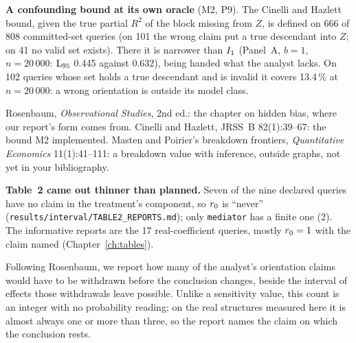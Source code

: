 \textbf{A confounding bound at its own oracle} (M2, P9). The Cinelli and Hazlett bound, given the true
partial $R^{2}$ of the block missing from $Z$, is defined on 666 of 808 committed-set queries (on 101
the wrong claim put a true descendant into $Z$; on 41 no valid set exists). There it is narrower than
$I_{1}$ (Panel~A, $b = 1$, $n = 20\,000$: $\mathrm{L}_{95}$ 0.445 against 0.632), being handed what the analyst
lacks. On 102 queries whose set holds a true descendant and is invalid it covers 13.4\,\% at
$n = 20\,000$: a wrong orientation is outside its model class.

\begin{fonte}
Rosenbaum, \emph{Observational Studies}, 2nd ed.: the chapter on hidden bias, where our report's form
comes from. Cinelli and Hazlett, JRSS~B 82(1):39--67: the bound M2 implemented. Masten and Poirier's
breakdown frontiers, \emph{Quantitative Economics} 11(1):41--111: a breakdown value with inference,
outside graphs, not yet in your bibliography.
\end{fonte}

\textbf{Table~2 came out thinner than planned.} Seven of the nine declared queries have no claim in the
treatment's component, so $r_{0}$ is ``never'' (\texttt{results/interval/TABLE2\_REPORTS.md}); only
\texttt{mediator} has a finite one (2). The informative reports are the 17 real-coefficient queries,
mostly $r_{0} = 1$ with the claim named (Chapter~\ref{ch:tables}).


\begin{sonorio}
Following Rosenbaum, we report how many of the analyst's orientation claims would have to be withdrawn
before the conclusion changes, beside the interval of effects those withdrawals leave possible. Unlike
a sensitivity value, this count is an integer with no probability reading; on the real structures
measured here it is almost always one or more than three, so the report names the claim on which the
conclusion rests.
\end{sonorio}


